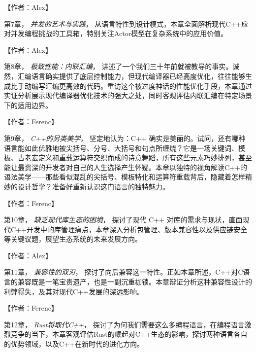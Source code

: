 【作者：Alex】

\hspace*{\fill}

第7章， \textit{并发的艺术与实践}， 从语言特性到设计模式，本章全面解析现代C++应对并发编程挑战的工具箱，特别关注Actor模型在复杂系统中的应用价值。

【作者：Alex】

\hspace*{\fill}

第8章， \textit{极致性能：内联汇编}， 讲述了一个我们三十年前就被教导的事实。诚然，汇编语言确实提供了底层控制能力，但现代编译器已经高度优化，往往能够生成比手动编写汇编更高效的代码。重访这个被过度神话的性能优化手段，本章通过实证分析展示现代编译器优化技术的强大之处，同时客观评估内联汇编在特定场景下的适用边界。

【作者：Ferenc】

\hspace*{\fill}

第9章， \textit{C++的另类美学}， 坚定地认为：C++ 确实是美丽的。试问，还有哪种语言能如此优雅地被尖括号、分号、大括号和句点所缠绕？它是一场关键词、模板、古老宏定义和重载运算符交织而成的诗意舞蹈，所有这些元素巧妙排列，甚至能让最资深的开发者对自己的人生选择产生怀疑。本章以独特的视角解读C++的语法美学——那些看似混乱的尖括号、模板特化和运算符重载背后，隐藏着怎样精妙的设计哲学？准备好重新认识这门语言的独特魅力。

【作者：Ferenc】

\hspace*{\fill}

第10章， \textit{缺乏现代库生态的困境}， 探讨了现代 C++ 对库的需求与现状，直面现代C++开发中的库管理痛点，本章深入分析包管理、版本兼容性以及供应链安全等关键议题，展望生态系统的未来发展方向。

【作者：Alex】

\hspace*{\fill}

第11章， \textit{兼容性的双刃}， 探讨了向后兼容这一特性。正如本章所述，C++对C语言的兼容既是一笔宝贵遗产，也是一副沉重枷锁。本章辩证分析这种兼容性设计的利弊得失，及其对现代C++发展的深远影响。

【作者：Ferenc】

\hspace*{\fill}

第12章， \textit{Rust将取代C++}， 探讨了为何我们需要这么多编程语言，在编程语言激烈竞争的当下，本章客观评估Rust的崛起对C++生态的影响，探讨两种语言各自的优势领域，以及C++在新时代的进化方向。

